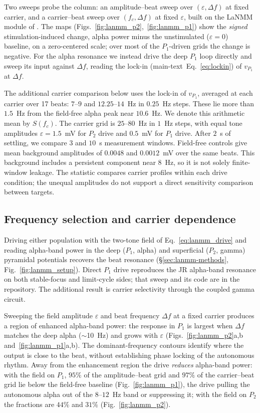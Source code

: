 Two sweeps probe the column: an amplitude--beat sweep over
$(\varepsilon,\Delta f)$ at fixed carrier, and a carrier--beat sweep
over $(f_c,\Delta f)$ at fixed $\varepsilon$, built on the LaNMM module of
\cite{ruffini2025cfc}. The maps
(Figs.~\ref{fig:lanmm_p2},~\ref{fig:lanmm_p1}) show the \emph{signed} stimulation-induced
change, alpha power minus the unstimulated ($\varepsilon=0$) baseline, on a zero-centered
scale; over most of the $P_1$-driven grids the change is negative. For the
alpha resonance we instead drive the deep $P_1$ loop directly and sweep its input against
$\Delta f$, reading the lock-in (\ifsupp main-text\fi\ Eq.~\eqref{eq:lockin}) of $v_{P_1}$ at $\Delta f$.

The additional carrier comparison below uses the lock-in
of $v_{P_1}$, averaged at each carrier over 17 beats: $7$--$9$ and
$12.25$--$14$~Hz in $0.25$~Hz steps. These lie more than $1.5$~Hz from the
field-free alpha peak near $10.6$~Hz. We denote this arithmetic mean by $S(f_c)$.
The carrier grid is $25$--$80$~Hz in $1$~Hz steps, with equal tone amplitudes
$\varepsilon=1.5$~mV for $P_2$ drive and $0.5$~mV for $P_1$ drive. After $2$~s
of settling, we compare $3$ and $10$~s measurement windows. Field-free controls
give mean background amplitudes of $0.0048$ and $0.0012$~mV over the same beats.
This background includes a persistent component near $8$~Hz, so it is not solely
finite-window leakage. The statistic compares carrier profiles within each drive
condition; the unequal amplitudes do not support a direct sensitivity comparison
between targets.

\subsection{Frequency selection and carrier dependence}\label{sec:lanmm-results}
Driving either population with the two-tone field of Eq.~\eqref{eq:lanmm_drive}
and reading alpha-band power in the deep ($P_1$, alpha) and superficial ($P_2$,
gamma) pyramidal potentials recovers the beat resonance
(\S\ref{sec:lanmm-methods}, Fig.~\ref{fig:lanmm_setup}). Direct $P_1$ drive reproduces the JR
alpha-band resonance on both stable-focus and limit-cycle sides; that sweep
and its code are in the repository. The additional result is carrier selectivity
through the coupled gamma circuit.

Sweeping the field amplitude $\varepsilon$ and beat frequency $\Delta f$ at a fixed
carrier produces a region of enhanced alpha-band power: the response in $P_1$ is largest
when $\Delta f$ matches the deep alpha ($\sim$10~Hz) and grows with $\varepsilon$
(Figs.~\ref{fig:lanmm_p2}a,b and~\ref{fig:lanmm_p1}a,b). The dominant-frequency
contours identify where the output is close to the beat, without establishing
phase locking of the autonomous rhythm. Away from the enhancement region the drive
\emph{reduces} alpha-band power: with the field on $P_1$, $95\%$ of the amplitude--beat
grid and $97\%$ of the carrier--beat grid lie below the field-free baseline
(Fig.~\ref{fig:lanmm_p1}), the drive pulling the autonomous alpha out of the $8$--$12$~Hz
band or suppressing it; with the field on $P_2$ the fractions are $44\%$ and $31\%$
(Fig.~\ref{fig:lanmm_p2}).


